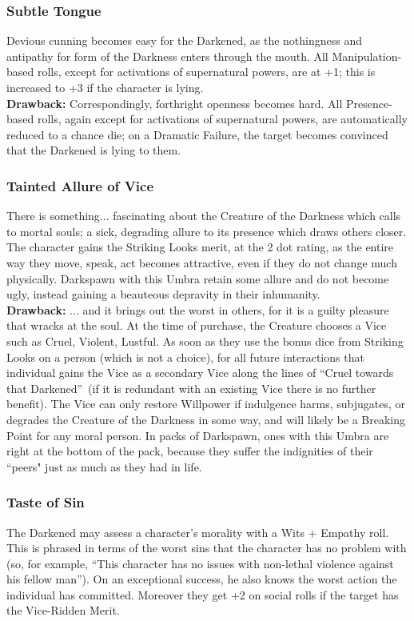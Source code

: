 \subsubsection*{Subtle Tongue}
Devious cunning becomes easy for the Darkened, as the nothingness and antipathy for form of the Darkness enters through the mouth. All Manipulation-based rolls, except for activations of supernatural powers, are at +1; this is increased to +3 if the character is lying. \\

\noindent \textbf{Drawback:} Correspondingly, forthright openness becomes hard. All Presence-based rolls, again except for activations of supernatural powers, are automatically reduced to a chance die; on a Dramatic Failure, the target becomes convinced that the Darkened is lying to them. 
 
\subsubsection*{Tainted Allure of Vice}
There is something... fascinating about the Creature of the Darkness which calls to mortal souls; a sick, degrading allure to its presence which draws others closer. The character gains the Striking Looks merit, at the 2 dot rating, as the entire way they move, speak, act becomes attractive, even if they do not change much physically. Darkspawn with this Umbra retain some allure and do not become ugly, instead gaining a beauteous depravity in their inhumanity. \\

\noindent \textbf{Drawback:} ... and it brings out the worst in others, for it is a guilty pleasure that wracks at the soul. At the time of purchase, the Creature chooses a Vice such as Cruel, Violent, Lustful. As soon as they use the bonus dice from Striking Looks on a person (which is not a choice), for all future interactions that individual gains the Vice as a secondary Vice along the lines of \textquotedblleft Cruel towards that Darkened\textquotedblright\, (if it is redundant with an existing Vice there is no further benefit). The Vice can only restore Willpower if indulgence harms, subjugates, or degrades the Creature of the Darkness in some way, and will likely be a Breaking Point for any moral person. In packs of Darkspawn, ones with this Umbra are right at the bottom of the pack, because they suffer the indignities of their \textquotedblleft peers" just as much as they had in life. 

\subsubsection*{Taste of Sin}
The Darkened may assess a character’s morality with a Wits + Empathy roll. This is phrased in terms of the worst sins that the character has no problem with (so, for example, “This character has no issues with non-lethal violence against his fellow man”). On an exceptional success, he also knows the worst action the individual has committed. Moreover they get +2 on social rolls if the target has the Vice-Ridden Merit.\\

